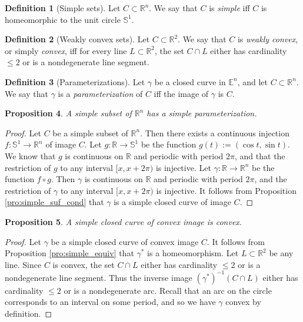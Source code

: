 \documentclass{amsart}
\newtheorem{proposition}{Proposition}[section]
\theoremstyle{definition}
\newtheorem{definition}[proposition]{Definition}
\theoremstyle{remark}
\begin{document}
\begin{definition}[Simple sets]
    Let $C\subset\mathbb{R}^n$.
    We say that $C$ is \emph{simple}
    iff $C$ is homeomorphic to
    the unit circle $\mathbb{S}^1$.
\end{definition}

\begin{definition}[Weakly convex sets]
    Let $C\subset\mathbb{R}^2$. We say that $C$ is
    \emph{weakly convex}, or simply \emph{convex},
    iff for every line $L\subset\mathbb{R}^2$, the set $C\cap L$
    either has cardinality $\le2$ or is a nondegenerate line segment.
\end{definition}

\begin{definition}[Parameterizations]
    Let $\gamma$ be a closed curve in $\mathbb{E}^n$,
    and let $C\subset\mathbb{R}^n$.
    We say that $\gamma$ is
    a \emph{parameterization} of $C$ iff the image of $\gamma$
    is $C$.
\end{definition}

\begin{proposition}
    \label{pro:simple_par}
    A simple subset of $\mathbb{R}^n$ has
    a simple parameterization.
\end{proposition}

\begin{proof}
    Let $C$ be a simple subset of $\mathbb{R}^n$.
    Then there exists a continuous injection $f:\mathbb{S}^1\to\mathbb{R}^n$
    of image $C$.
    Let $g:\mathbb{R}\to\mathbb{S}^1$ be the function
    $g(t):=(\cos t,\sin t)$. We know that $g$ is continuous
    on $\mathbb{R}$ and periodic with period $2\pi$, and that
    the restriction of $g$ to any interval $[x,x+2\pi)$
    is injective. Let $\gamma:\mathbb{R}\to\mathbb{R}^n$ be the function
    $f\circ g$. Then $\gamma$ is continuous
    on $\mathbb{R}$ and periodic with period $2\pi$, and the
    restriction of $\gamma$ to any interval $[x,x+2\pi)$ is injective.
    It follows from Proposition \ref{pro:simple_suf_cond}
    that $\gamma$ is a simple closed curve of image $C$.
\end{proof}

\begin{proposition}
    \label{pro:simple_convex}
    A simple closed curve of convex image is convex.
\end{proposition}

\begin{proof}
    Let $\gamma$ be a simple closed curve of convex image $C$.
    It follows from Proposition \ref{pro:simple_equiv}
    that $\gamma^*$ is a homeomorphism.
    Let $L\subset\mathbb{R}^2$ be any line.
    Since $C$ is convex, the set $C\cap L$
    either has cardinality $\le2$ or is a nondegenerate line segment.
    Thus the inverse image $(\gamma^*)^{-1}(C\cap L)$
    either has cardinality $\le2$ or is a nondegenerate arc.
    Recall that an arc on the circle corresponds to an interval
    on some period, and so we have $\gamma$ convex by definition.
\end{proof}
\end{document}
